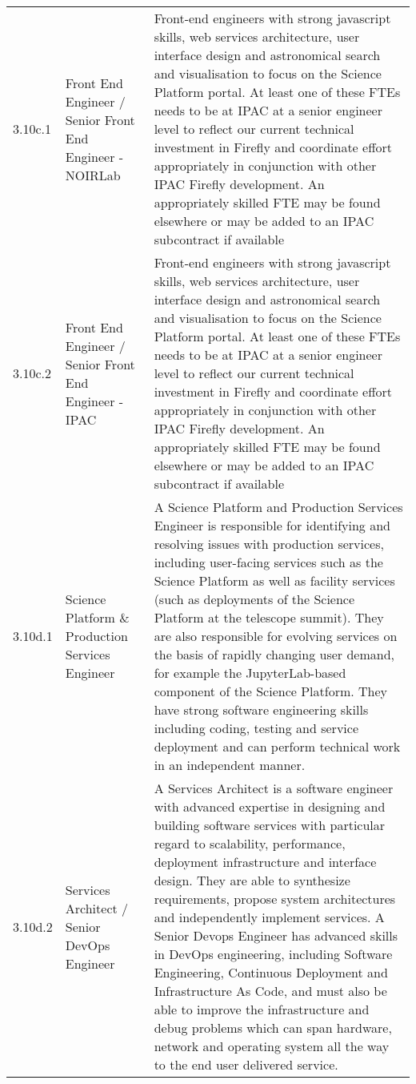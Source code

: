 \begin{longtable} {|p{}|p{}|p{}|}
{} \\ \hline
{3.10c.1}&{Front End Engineer / Senior Front End Engineer - NOIRLab}&{Front-end engineers with strong javascript skills, web services architecture, user interface design and astronomical search and visualisation to focus on the Science Platform portal. At least one of these FTEs needs to be at IPAC at a senior engineer level to reflect our current technical investment in Firefly and coordinate effort appropriately in conjunction with other IPAC Firefly development. An appropriately skilled FTE may be found elsewhere or may be added to an IPAC subcontract if available} \\ \hline
{3.10c.2}&{Front End Engineer / Senior Front End Engineer - IPAC}&{Front-end engineers with strong javascript skills, web services architecture, user interface design and astronomical search and visualisation to focus on the Science Platform portal. At least one of these FTEs needs to be at IPAC at a senior engineer level to reflect our current technical investment in Firefly and coordinate effort appropriately in conjunction with other IPAC Firefly development. An appropriately skilled FTE may be found elsewhere or may be added to an IPAC subcontract if available} \\ \hline
{3.10d.1}&{Science Platform \& Production Services Engineer}&{A Science Platform and Production Services Engineer is responsible for identifying and resolving  issues with production services, including user-facing services such as the Science Platform as well as facility services (such as deployments of the Science Platform at the telescope summit). They are also responsible for evolving services on the basis of rapidly changing user demand, for example the JupyterLab-based component of the Science Platform. They have strong software engineering skills including coding, testing and service deployment and can perform technical work in an independent manner.} \\ \hline
{3.10d.2}&{Services Architect / Senior DevOps Engineer}&{A Services Architect is a software engineer with advanced expertise in designing and building software services with particular regard to scalability, performance, deployment infrastructure and interface design. They are able to synthesize requirements, propose system architectures and independently implement services.
A Senior Devops Engineer has advanced skills in DevOps engineering, including Software Engineering, Continuous Deployment and Infrastructure As Code, and must also be able to improve the infrastructure and debug problems which can span hardware, network and operating system all the way to the end user delivered service.
}
\end{longtable}
